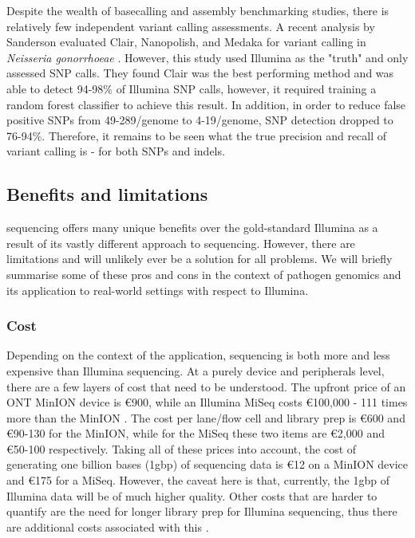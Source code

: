 Despite the wealth of \ont{} basecalling \cite{wick2019} and assembly \cite{wick2020} benchmarking studies, there is relatively few independent variant calling assessments. A recent analysis by Sanderson \etal{} evaluated Clair, Nanopolish, and Medaka for variant calling in \textit{Neisseria gonorrhoeae} \cite{sanderson2020}. However, this study used Illumina as the "truth" and only assessed SNP calls. They found Clair was the best performing method and was able to detect 94-98\% of Illumina SNP calls, however, it required training a random forest classifier to achieve this result. In addition, in order to reduce false positive SNPs from 49-289/genome to 4-19/genome, SNP detection dropped to 76-94\%. Therefore, it remains to be seen what the true precision and recall of \ont{} variant calling is - for both SNPs and indels.

\subsection{Benefits and limitations}
\label{sec:ont-benefits}

\ont{} sequencing offers many unique benefits over the gold-standard Illumina as a result of its vastly different approach to sequencing. However, there are limitations and \ont{} will unlikely ever be a solution for all problems. We will briefly summarise some of these pros and cons in the context of pathogen genomics and its application to real-world settings with respect to Illumina.

\subsubsection{Cost}
Depending on the context of the application, \ont{} sequencing is both more and less expensive than Illumina sequencing. At a purely device and peripherals level, there are a few layers of cost that need to be understood. The upfront price of an ONT MinION device is \euro900, while an Illumina MiSeq costs \euro100,000 - 111 times more than the MinION \cite{Tedersoo2021}. The cost per lane/flow cell and library prep is \euro600 and \euro90-130 for the MinION, while for the MiSeq these two items are \euro2,000 and \euro50-100 respectively. Taking all of these prices into account, the cost of generating one billion bases (1gbp) of sequencing data is \euro12 on a MinION device and \euro175 for a MiSeq. However, the caveat here is that, currently, the 1gbp of Illumina data will be of much higher quality. Other costs that are harder to quantify are the need for longer library prep for Illumina sequencing, thus there are additional costs associated with this \cite{Tedersoo2021}.

